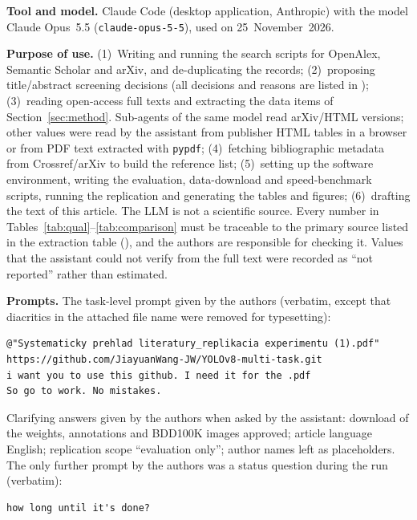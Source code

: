 \textbf{Tool and model.} Claude Code (desktop application, Anthropic) with the model Claude Opus~5.5 (\texttt{claude-opus-5-5}), used on 25~November~2026.

\textbf{Purpose of use.}
(1)~Writing and running the search scripts for OpenAlex, Semantic Scholar and arXiv, and de-duplicating the records;
(2)~proposing title/abstract screening decisions (all decisions and reasons are listed in );
(3)~reading open-access full texts and extracting the data items of Section~\ref{sec:method}. Sub-agents of the same model read arXiv/HTML versions; other values were read by the assistant from publisher HTML tables in a browser or from PDF text extracted with \texttt{pypdf};
(4)~fetching bibliographic metadata from Crossref/arXiv to build the reference list;
(5)~setting up the software environment, writing the evaluation, data-download and speed-benchmark scripts, running the replication and generating the tables and figures;
(6)~drafting the text of this article.
The LLM is not a scientific source. Every number in Tables~\ref{tab:qual}--\ref{tab:comparison} must be traceable to the primary source listed in the extraction table (), and the authors are responsible for checking it. Values that the assistant could not verify from the full text were recorded as ``not reported'' rather than estimated.

\textbf{Prompts.} The task-level prompt given by the authors (verbatim, except that diacritics in the attached file name were removed for typesetting):
\begin{lstlisting}
@"Systematicky prehlad literatury_replikacia experimentu (1).pdf"
https://github.com/JiayuanWang-JW/YOLOv8-multi-task.git
i want you to use this github. I need it for the .pdf
So go to work. No mistakes.
\end{lstlisting}
Clarifying answers given by the authors when asked by the assistant: download of the weights, annotations and BDD100K images approved; article language English; replication scope ``evaluation only''; author names left as placeholders. The only further prompt by the authors was a status question during the run (verbatim):
\begin{lstlisting}
how long until it's done?
\end{lstlisting}

